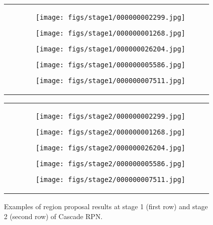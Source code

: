 \documentclass{article}
\begin{document}
	\begin{figure*}[t]
		\centering
		\begin{tabular}{c@{ }c}
			\rotatebox[origin=c]{90}{Stage 1} &
			\begin{subfigure}{0.185\textwidth}
				\centering
				\texttt{[image: figs/stage1/000000002299.jpg]}
			\end{subfigure}
			\begin{subfigure}{0.185\textwidth}
				\centering
				\texttt{[image: figs/stage1/000000001268.jpg]}
			\end{subfigure}
			\begin{subfigure}{0.185\textwidth}
				\centering
				\texttt{[image: figs/stage1/000000026204.jpg]}
			\end{subfigure}
			\begin{subfigure}{0.185\textwidth}
				\centering
				\texttt{[image: figs/stage1/000000005586.jpg]}
			\end{subfigure}
			\begin{subfigure}{0.185\textwidth}
				\centering
				\texttt{[image: figs/stage1/000000007511.jpg]}
			\end{subfigure}
		\end{tabular}
		
		\vspace{0.09cm}
		\begin{tabular}{c@{ }c}
			\rotatebox[origin=c]{90}{Stage 2} &
			\begin{subfigure}{0.185\textwidth}
				\centering
				\texttt{[image: figs/stage2/000000002299.jpg]}
			\end{subfigure}
			\begin{subfigure}{0.185\textwidth}
				\centering
				\texttt{[image: figs/stage2/000000001268.jpg]}
			\end{subfigure}
			\begin{subfigure}{0.185\textwidth}
				\centering
				\texttt{[image: figs/stage2/000000026204.jpg]}
			\end{subfigure}
			\begin{subfigure}{0.185\textwidth}
				\centering
				\texttt{[image: figs/stage2/000000005586.jpg]}
			\end{subfigure}
			\begin{subfigure}{0.185\textwidth}
				\centering
				\texttt{[image: figs/stage2/000000007511.jpg]}
			\end{subfigure}
		\end{tabular}
		\caption{Examples of region proposal results at stage 1 (first row) and stage 2 (second row) of Cascade RPN.}
		\label{fig:examples}
	\end{figure*}
	
\end{document}
